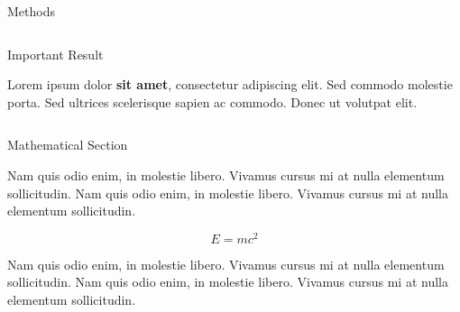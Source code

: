 \documentclass[final]{beamer}
\newlength{\onecolwid}
\newlength{\twocolwid}
\begin{document}
\begin{frame}[t]
\begin{columns}[t]
\begin{column}{\twocolwid}
\begin{columns}[t,totalwidth=\twocolwid]
\begin{column}{\onecolwid}
\begin{block}{Methods}
\end{block}


\end{column} %

\end{columns} %


\begin{alertblock}{Important Result}

Lorem ipsum dolor \textbf{sit amet}, consectetur adipiscing elit. Sed commodo molestie porta. Sed ultrices scelerisque sapien ac commodo. Donec ut volutpat elit.

\end{alertblock} 


\begin{columns}[t,totalwidth=\twocolwid] %

\begin{column}{\onecolwid} %


\begin{block}{Mathematical Section}

Nam quis odio enim, in molestie libero. Vivamus cursus mi at nulla elementum sollicitudin. Nam quis odio enim, in molestie libero. Vivamus cursus mi at nulla elementum sollicitudin.
  
\begin{equation}
E = mc^{2}
\label{eqn:Einstein}
\end{equation}

Nam quis odio enim, in molestie libero. Vivamus cursus mi at nulla elementum sollicitudin. Nam quis odio enim, in molestie libero. Vivamus cursus mi at nulla elementum sollicitudin.


\end{block}
\end{column}
\end{columns}
\end{column}
\end{columns}
\end{frame}
\end{document}
